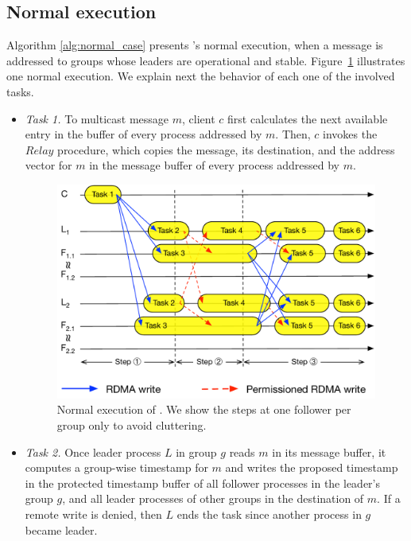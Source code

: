 \subsection{Normal execution}
\label{sec:normalcase}



% 

Algorithm \ref{alg:normal_case} presents \libname's normal execution, when a message is addressed to groups whose leaders are operational and stable.
Figure~\ref{fig:normal_operation_time} illustrates one normal execution.
We explain next the behavior of each one of the involved tasks.

\begin{itemize}
\item \emph{Task 1.} To multicast message $m$, client $c$ first calculates the next available entry in the buffer of every process addressed by $m$. Then, $c$ invokes the $Relay$ procedure, which copies the message, its destination, and the address vector for $m$ in the message buffer of every process addressed by $m$.

\begin{figure}[ht!]
  \centering
  \includegraphics[width=1\linewidth]{figures/execution}
  \caption{Normal execution of \libname. We show the steps at one follower per group only to avoid cluttering.}
  \label{fig:normal_operation_time}
\end{figure}

\item \emph{Task 2.} Once leader process $L$ in group $g$ reads $m$ in its message buffer, it computes a
group-wise timestamp for $m$ and writes the proposed timestamp 
in the protected timestamp buffer of all follower processes in the leader's group $g$, and all leader processes 
of other groups in the destination of $m$.
If a remote write is denied, then $L$ ends the task since another process in $g$ became leader.


\end{itemize}
